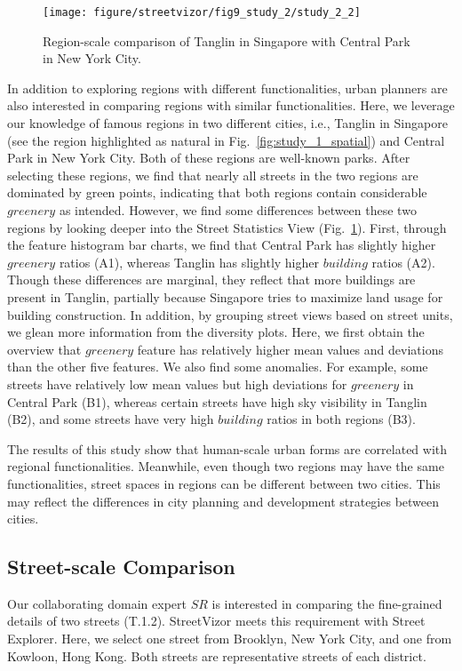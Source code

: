 \begin{figure}[t]
	\centering
	\texttt{[image: figure/streetvizor/fig9\_study\_2/study\_2\_2]}
	\vspace{-7mm}
	\caption{Region-scale comparison of Tanglin in Singapore with Central Park in New York City.}
	\label{fig:center-park-tanglin}
	\vspace{-5mm}
\end{figure}

In addition to exploring regions with different functionalities, urban planners are also interested in comparing regions with similar functionalities.
Here, we leverage our knowledge of famous regions in two different cities, i.e., Tanglin in Singapore (see the region highlighted as natural in Fig.~\ref{fig:study_1_spatial}) and Central Park in New York City.
Both of these regions are well-known parks.
After selecting these regions, we find that nearly all streets in the two regions are dominated by green points, indicating that both regions contain considerable $greenery$ as intended.
However, we find some differences between these two regions by looking deeper into the Street Statistics View (Fig.~\ref{fig:center-park-tanglin}).
First, through the feature histogram bar charts, we find that Central Park has slightly higher $greenery$ ratios (A1), whereas Tanglin has slightly higher $building$ ratios (A2).
Though these differences are marginal, they reflect that more buildings are present in Tanglin, partially because Singapore tries to maximize land usage for building construction.
In addition, by grouping street views based on street units, we glean more information from the diversity plots.
Here, we first obtain the overview that $greenery$ feature has relatively higher mean values and deviations than the other five features.
We also find some anomalies.
For example, some streets have relatively low mean values but high deviations for $greenery$ in Central Park (B1), whereas certain streets have high sky visibility in Tanglin (B2), and some streets have very high $building$ ratios in both regions (B3).

The results of this study show that human-scale urban forms are correlated with regional functionalities.
Meanwhile, even though two regions may have the same functionalities, street spaces in regions can be different between two cities.
This may reflect the differences in city planning and development strategies between cities.


\subsection{Street-scale Comparison}
Our collaborating domain expert $SR$ is interested in comparing the fine-grained details of two streets (T.1.2).
StreetVizor meets this requirement with Street Explorer.
Here, we select one street from Brooklyn, New York City, and one from Kowloon, Hong Kong.
Both streets are representative streets of each district.

